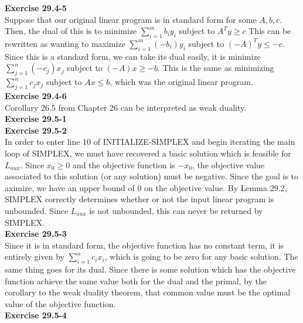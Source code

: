 \documentclass{article}
\begin{document}

\noindent\textbf{Exercise 29.4-5}\\

Suppose that our original linear program is in standard form for some $A,b,c$. Then, the dual of this is to minimize $\sum_{i=1}^m b_i y_i$ subject to $A^T y \ge c$ This can be rewritten as wanting to maximize $\sum_{i=1}^m (-b_i) y_i$ subject to $(-A)^T y \le -c$. Since this is a standard form, we can take its dual easily, it is minimize $\sum_{j=1}^n (-c_j) x_j$ subject to $(-A)x \ge -b$. This is the same as minimizing $\sum_{j=1}^n c_j x_j$ subject to $Ax \le b$, which was the original linear program.\\

\noindent\textbf{Exercise 29.4-6}\\

Corollary 26.5 from Chapter 26 can be interpreted as weak duality. \\

\noindent\textbf{Exercise 29.5-1}\\

\noindent\textbf{Exercise 29.5-2}\\

In order to enter line 10 of INITIALIZE-SIMPLEX and begin iterating the main loop of SIMPLEX, we must have recovered a basic solution which is feasible for $L_{aux}$. Since $x_0 \geq 0$ and the objective function is $-x_0$, the objective value associated to this solution (or any solution) must be negative. Since the goal is to aximize, we have an upper bound of 0 on the objective value. By Lemma 29.2, SIMPLEX correctly determines whether or not the input linear program is unbounded.  Since $L_{aux}$ is not unbounded, this can never be returned by SIMPLEX. \\

\noindent\textbf{Exercise 29.5-3}\\

Since it is in standard form, the objective function has no constant term, it is entirely given by $\sum_{i=1}^n c_i x_i$, which is going to be zero for any basic solution. The same thing goes for its dual. Since there is some solution which has the objective function achieve the same value both for the dual and the primal, by the corollary to the weak duality theorem, that common value must be the optimal value of the objective function.\\

\noindent\textbf{Exercise 29.5-4}\\
\end{document}

